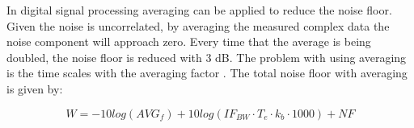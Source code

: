 
 




In digital signal processing averaging can be applied to reduce the noise floor. Given the noise is uncorrelated, by averaging the measured complex data the noise component will approach zero. Every time that the average is being doubled, the noise floor is reduced with 3 dB. The problem with using averaging is the time scales with the averaging factor \citep{KeysightAVG}. The total noise floor with averaging is given by:

\begin{equation}
W = - 10log(AVG_f) +10log(IF_{BW}\cdot T_{e}\cdot k_b\cdot 1000) + NF 
\label{NFwithAVG}
\end{equation}

